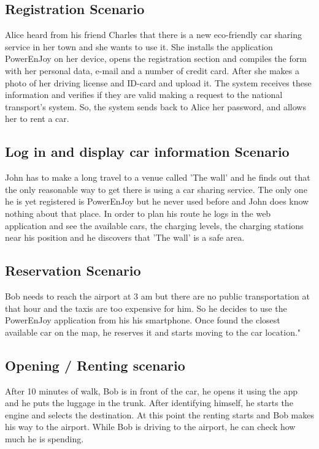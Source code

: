 \subsection {Registration Scenario}
Alice heard from his friend Charles that there is a new eco-friendly car sharing service in her town and she wants to use it. She installs the application PowerEnJoy on her device, opens the registration section and compiles the form with her personal data, e-mail and a number of credit card. After she makes a photo of her driving license and ID-card and upload it. The system receives these information and verifies if they are valid making a request to the national transport's system. So, the system sends back to Alice her password, and allows her to rent a car. 

\subsection{Log in and display car information Scenario}
John has to make a long travel to a venue called 'The wall' and he finds out that the only reasonable way to get there is using a car sharing service. The only one he is yet registered is PowerEnJoy but he never used before and John does know nothing about that place. In order to plan his route he logs in the web application and see the available cars, the charging levels, the charging stations near his position and he discovers that 'The wall' is a safe area. 
\subsection{Reservation Scenario}
Bob needs to reach the airport at 3 am but there are no public transportation at that hour and the taxis are too expensive for him. So he decides to use the PowerEnJoy application from his his smartphone. Once found the closest available car on the map, he reserves it and starts moving to the car location." 


\subsection{Opening / Renting scenario}
After 10 minutes of walk, Bob is in front of the car, he opens it using the app and he puts the luggage in the trunk. After identifying himself, he starts the engine and selects the destination. At this point the renting starts and Bob makes his way to the airport. 
While Bob is driving to the airport, he can check how much he is spending.

